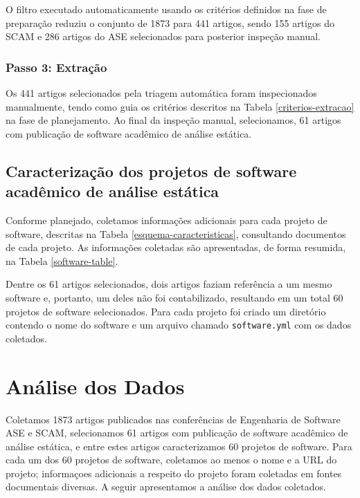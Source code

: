 O filtro executado automaticamente usando os critérios definidos na fase de
preparação reduziu o conjunto de 1873 para 441 artigos, sendo 155 artigos do SCAM e
286 artigos do ASE selecionados para posterior inspeção manual.

\subsubsection{Passo 3: Extração}

Os 441 artigos selecionados pela triagem automática foram inspecionados manualmente, tendo como guia
os critérios descritos na Tabela \ref{criterios-extracao} na fase de
planejamento. Ao final da inspeção manual, selecionamos, 61 artigos com publicação de
software acadêmico de análise estática.

\subsection{Caracterização dos projetos de software acadêmico de análise estática}

Conforme planejado, coletamos informações adicionais 
para cada projeto de software, descritas na Tabela
\ref{esquema-caracteristicas}, consultando
documentos de cada projeto. As informações coletadas são apresentadas, de forma
resumida, na Tabela \ref{software-table}.



Dentre os 61 artigos selecionados, dois artigos faziam referência a um mesmo software e,
portanto, um deles não foi contabilizado, 
resultando em um total 60 projetos de software selecionados. Para cada projeto foi criado um
diretório contendo o nome do software e um arquivo chamado
\texttt{software.yml} com os dados coletados.


\section{Análise dos Dados} \label{estudo1:analise}

Coletamos 1873 artigos publicados nas conferências de Engenharia de Software
ASE e SCAM, selecionamos 61 artigos com publicação de software acadêmico de
análise estática, e entre estes artigos caracterizamos 60 projetos de software.
Para cada um dos 60 projetos de software, coletamos ao menos o nome e a URL do projeto;
informaçoes adicionais a respeito do projeto foram coletadas em fontes documentais diversas.
A seguir apresentamos a análise dos dados coletados.

